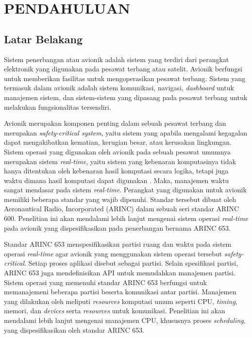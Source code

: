 \chapter{PENDAHULUAN}

\section{Latar Belakang}

Sistem penerbangan atau avionik adalah sistem yang terdiri dari perangkat elektronik yang digunakan pada pesawat terbang atau satelit.
Avionik berfungsi untuk memberikan fasilitas untuk mengoperasikan pesawat terbang.
Sistem yang termasuk dalam avionik adalah sistem komunikasi, navigasi, \textit{dashboard} untuk manajemen sistem, dan sistem-sistem yang dipasang pada pesawat terbang untuk melakukan fungsionalitas tersendiri.


Avionik merupakan komponen penting dalam sebuah pesawat terbang dan merupakan \textit{safety\hyp critical system}, yaitu sistem yang apabila mengalami kegagalan dapat mengakibatkan kematian, kerugian besar, atau kerusakan lingkungan.
Sistem operasi yang digunakan oleh avionik pada sebuah pesawat umumnya merupakan sistem \textit{real-time}, yaitu sistem yang kebenaran komputasinya tidak hanya ditentukan oleh kebenaran hasil komputasi secara logika, tetapi juga waktu dimana hasil komputasi dapat digunakan \citep[p.~6]{Shin1994}.
Maka, manajemen waktu sangat mendasar pada sistem \textit{real-time}.
Perangkat yang digunakan untuk avionik memiliki beberapa standar yang wajib dipenuhi.
Standar tersebut dibuat oleh Aeronautical Radio, Incorporated (ARINC) dalam sebuah seri standar ARINC 600.
Penelitian ini akan mendalami lebih lanjut mengenai sistem operasi \textit{real-time} pada avionik yang dispesifikasikan pada penerbangan bernama ARINC 653.


Standar ARINC 653 menspesifikasikan partisi ruang dan waktu pada sistem operasi \textit{real-time} agar avionik yang menggunakan sistem operasi tersebut \textit{safety-critical}.
Setiap proses aplikasi disebut sebagai partisi.
Selain spesifikasi partisi, ARINC 653 juga mendefinisikan API untuk memudahkan manajemen partisi.
Sistem operasi yang memenuhi standar ARINC 653 berfungsi untuk memanajemeni beberapa partisi beserta komunikasi antar partisi.
Manajemen yang dilakukan oleh meliputi \textit{resources} komputasi umum seperti CPU, \textit{timing}, memori, dan \textit{devices} serta \textit{resources} untuk komunikasi.
Penelitian ini akan mendalami lebih lanjut mengenai manajemen CPU, khususnya proses \textit{scheduling}, yang dispesifikasikan oleh standar ARINC 653.


